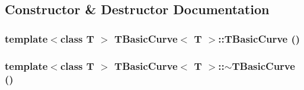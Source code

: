 \subsection{Constructor \& Destructor Documentation}
\hypertarget{classTBasicCurve_ace94905798645e41acb2facd51403fb4}{
\subsubsection[{TBasicCurve}]{\setlength{\rightskip}{0pt plus 5cm}template$<$class T $>$ {\bf TBasicCurve}$<$ T $>$::{\bf TBasicCurve} ()}}
\label{classTBasicCurve_ace94905798645e41acb2facd51403fb4}
\hypertarget{classTBasicCurve_ab7d261b39efee8a494db4cca21e77810}{
\subsubsection[{$\sim$TBasicCurve}]{\setlength{\rightskip}{0pt plus 5cm}template$<$class T $>$ {\bf TBasicCurve}$<$ T $>$::$\sim${\bf TBasicCurve} ()}}
\label{classTBasicCurve_ab7d261b39efee8a494db4cca21e77810}


